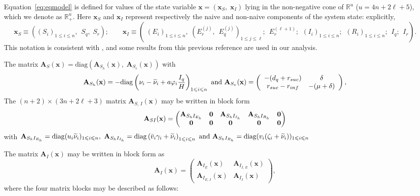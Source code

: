\documentclass[a4paper]{article}
\newcommand{\R}{\mathbb{R}}
\newcommand{\diag}{\mathrm{diag}}
\newcommand{\mb}{\mathbf}
\newcommand{\varphiVar}{r_{inf}}
\newcommand{\varpiVar}{r_{suc}}
\newcommand{\hatmuVar}{d_q}
\begin{document}
 Equation~\eqref{eq:eqmodel} is defined for values of the state variable  $\mathbf x=(\mathbf x_S,\;\mathbf x_I)$ lying in the non-negative cone of $\R^u$ ($
u=4n+ 2\ell+5$), which we denote as $\R^u_+$.  Here $\mathbf x_S$  and  $\mathbf x_I$ represent respectively the naive and non-naive components of the system state: explicitly, 
\begin{equation}\label{eq:naive_and_non}
\mathbf x_S\equiv \left((S_i)_{1\leqslant i\leqslant
n},~~S_q,\;S_r\right) ; \qquad
\mathbf x_I\equiv \left(\;(E_{i})_{1\leqslant i\leqslant n},\;(E_r^{(j)},~~E_q^{(j)})_{1\leqslant j\leqslant \ell};~~E_r^{(\ell+1)};~~(I_i)_{1\leqslant i\leqslant n};~~(R_i)_{1\leqslant i\leqslant n};~~I_q;~~I_r\right).
\end{equation}
This notation is consistent with \cite{KamSal07}, and some results from this previous reference  are used in our analysis. 
	
\noindent The matrix $\mathbf A_S(\mathbf x) =\diag\left(\mathbf A_{S_h}(\mathbf x),\;\mathbf A_{S_v}(\mathbf x)\right)$ with 
\begin{equation}\label{eq:A_S_v}
\mathbf A_{S_h}(\mathbf x) = -\diag\left(\nu_i-\widetilde\nu_i+a\varphi_i \frac{I_q}{H}\right)_{1\leqslant i\leqslant n} \hbox{ and }\mathbf A_{S_v}(\mathbf x) =  \left(\begin{array}{cc} -(\hatmuVar +\varpiVar ) &   \delta \\ \varpiVar -\varphiVar  &  -(\mu+\delta) \end{array}\right),
\end{equation}
The $(n+2)\times (3n+2\ell+3)$ matrix $\mathbf A_{S,\,I}(\mathbf x)$ may be written in block form 
$$\mathbf A_{SI}(\mathbf x)=\begin{pmatrix}\mathbf  A_{S_hI_{E_h}} & \mathbf 0 &\mathbf  A_{S_hI_{I_h}}&\mathbf  A_{S_hI_{R_h}}&\mathbf 0\cr \mathbf 0&\mathbf 0&\mathbf 0&\mathbf 0&\mathbf 0\end{pmatrix} $$ with $\mathbf  A_{S_hI_{E_h}} = \mathrm{diag}(u_i\widetilde\nu_i)_{1\leqslant i\leqslant n},~ \mathbf  A_{S_hI_{I_h}} = \mathrm{diag}\left(\bar v_i\gamma_i+\widetilde\nu_i\right)_{1\leqslant i\leqslant n} \hbox{ and } \mathbf  A_{S_hI_{R_h}} = \mathrm{diag}(v_i(\zeta_i+\widetilde\nu_i))_{1\leqslant i\leqslant n}$  




\noindent The    matrix $\mathbf A_I(\mathbf x)$ may be written in block form  as 
\begin{equation}
\mathbf A_I(\mathbf x) =    \left(\begin{array}{cc} \mathbf A_{I_E}(\mathbf x)
&   \mathbf A_{I_{I,\,E}}(\mathbf x) \\ \mathbf A_{I_{E,\,I}}(\mathbf x) &  \mathbf
A_{I_I}(\mathbf x) \end{array}\right),
\label{eq:mati}
\end{equation}
where the four matrix blocks may be described as follows: 
\medskip
\end{document}
